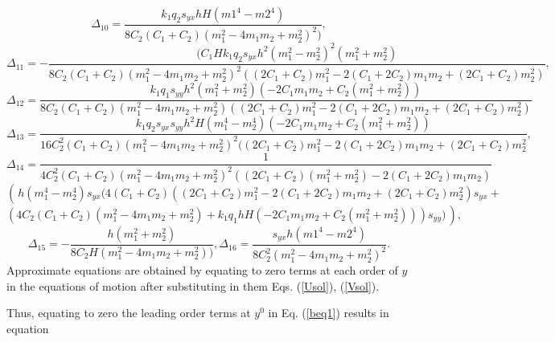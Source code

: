 \[
\Delta_{10}=\frac{k_1 q_2 s_{yx}h H  (m1^4 - m2^4) }{
	8 C_2 (C_1 + C_2) (m_1^2 - 4 m_1 m_2 + m_2^2)^2)},
\]
\[
\Delta_{11}=-\frac{(C_1 H k_1  q_2 s_{yx}  h^2 (m_1^2 - m_2^2)^2 (m_1^2 + m_2^2)}{
	8 C_2 (C_1 + C_2) (m_1^2 - 4 m_1 m_2 + m_2^2)^2 ((2 C_1 + C_2) m_1^2 - 
	2 (C_1 + 2 C_2) m_1 m_2 + (2 C_1 + C_2) m_2^2)},
\]
\[
\Delta_{12}=\frac{k_1 q_1 s_{yy} h^2  (m_1^2 + m_2^2) (-2 C_1 m_1 m_2 + 
	C_2 (m_1^2 + m_2^2))}{8 C_2 (C_1 + C_2) (m_1^2 - 4 m_1 m_2 + 
	m_2^2) ((2 C_1 + C_2) m_1^2 - 2 (C_1 + 2 C_2) m_1 m_2 + (2 C_1 + C_2) m_2^2)}
\]
\[
\Delta_{13}=\frac{ k_1 q_2 s_{yx} s_{yy} h^2 H (m_1^4 - m_2^4) (-2 C_1 m_1 m_2 + 
	C_2 (m_1^2 + m_2^2))}{16 C_2^2 (C_1 + C_2) (m_1^2 - 4 m_1 m_2 + 
	m_2^2)^2 ((2 C_1 + C_2) m_1^2 - 2 (C_1 + 2 C_2) m_1 m_2 + (2 C_1 + C_2) m_2^2},
\]
\[
\Delta_{14}=\frac{1} {4 C_2^2 (C_1 + C_2) (m_1^2 - 
	4 m_1 m_2 + m_2^2)^2 ((2 C_1 + C_2) (m_1^2+m_2^2) - 
	2 (C_1 + 2 C_2) m_1 m_2 )}
\]
\[ \left(\frac{}{} h (m_1^4 - 
m_2^4) s_{yx} (4 (C_1 + C_2) ((2 C_1 + C_2) m_1^2 - 
2 (C_1 + 2 C_2) m_1 m_2 + (2 C_1 + C_2) m_2^2) s_{yx} + \right.
\]
\[
\left.(4 C_2 (C_1 + 
C_2) (m_1^2 - 4 m_1 m_2 + m_2^2) + 
k_1 q_1  h H (-2 C_1 m_1 m_2 + 
C_2 (m_1^2 + m_2^2)) ) s_{yy})\frac{}{}\right) ,
\]
\[
\Delta_{15}=-\frac{h (m_1^2 + m_2^2)}{8 C_2 H (m_1^2 - 4 m_1 m_2 + m_2^2))},
\Delta_{16}=\frac{s_{yx} h (m1^4 - m2^4)}{8 C_2^2 (m_1^2 - 4 m_1 m_2 + m_2^2)^2}.
\]
Approximate equations are obtained by equating to zero terms at each order of $y$ in the equations of motion after substituting in them Eqs. (\ref{Usol}), (\ref{Vsol}). 

Thus, equating to zero the leading order terms at $y^0$ in Eq. (\ref{beq1}) results in  equation

